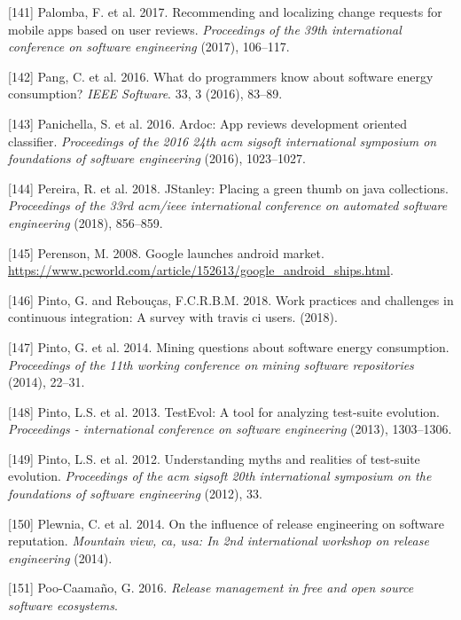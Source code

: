 \documentclass[]{book}
\begin{document}
\hypertarget{ref-palomba2017recommending}{}
{[}141{]} Palomba, F. et al. 2017. Recommending and localizing change
requests for mobile apps based on user reviews. \emph{Proceedings of the
39th international conference on software engineering} (2017), 106--117.

\hypertarget{ref-PHA2016}{}
{[}142{]} Pang, C. et al. 2016. What do programmers know about software
energy consumption? \emph{IEEE Software}. 33, 3 (2016), 83--89.

\hypertarget{ref-panichella2016ardoc}{}
{[}143{]} Panichella, S. et al. 2016. Ardoc: App reviews development
oriented classifier. \emph{Proceedings of the 2016 24th acm sigsoft
international symposium on foundations of software engineering} (2016),
1023--1027.

\hypertarget{ref-PSCS2018}{}
{[}144{]} Pereira, R. et al. 2018. JStanley: Placing a green thumb on
java collections. \emph{Proceedings of the 33rd acm/ieee international
conference on automated software engineering} (2018), 856--859.

\hypertarget{ref-androidMarketLaunch}{}
{[}145{]} Perenson, M. 2008. Google launches android market.
\url{https://www.pcworld.com/article/152613/google_android_ships.html}.

\hypertarget{ref-pinto2018work}{}
{[}146{]} Pinto, G. and Rebouças, F.C.R.B.M. 2018. Work practices and
challenges in continuous integration: A survey with travis ci users.
(2018).

\hypertarget{ref-PCL2014}{}
{[}147{]} Pinto, G. et al. 2014. Mining questions about software energy
consumption. \emph{Proceedings of the 11th working conference on mining
software repositories} (2014), 22--31.

\hypertarget{ref-pinto2013}{}
{[}148{]} Pinto, L.S. et al. 2013. TestEvol: A tool for analyzing
test-suite evolution. \emph{Proceedings - international conference on
software engineering} (2013), 1303--1306.

\hypertarget{ref-pinto2012understanding}{}
{[}149{]} Pinto, L.S. et al. 2012. Understanding myths and realities of
test-suite evolution. \emph{Proceedings of the acm sigsoft 20th
international symposium on the foundations of software engineering}
(2012), 33.

\hypertarget{ref-plewnia2014a}{}
{[}150{]} Plewnia, C. et al. 2014. On the influence of release
engineering on software reputation. \emph{Mountain view, ca, usa: In 2nd
international workshop on release engineering} (2014).

\hypertarget{ref-poo-caamano2016a}{}
{[}151{]} Poo-Caamaño, G. 2016. \emph{Release management in free and
open source software ecosystems}.
\end{document}

